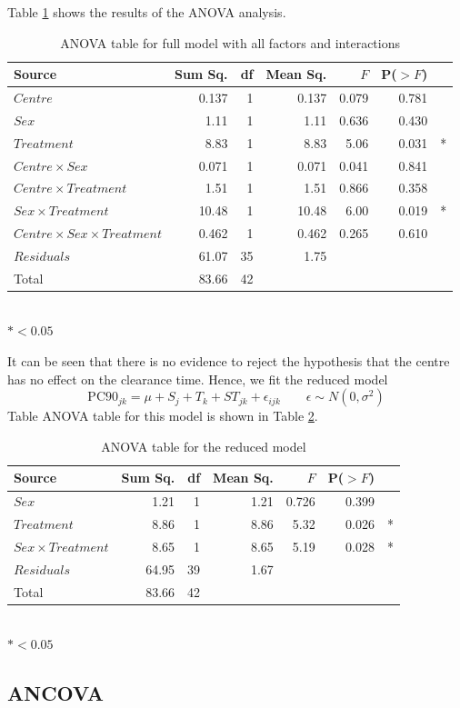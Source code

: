 Table \ref{pc90aov} shows the results of the ANOVA analysis.
\begin{table}[h]
\centering
\caption{ANOVA table for full model with all factors and interactions}\label{pc90aov}
\begin{tabular}{l|rrrrrl}
Source&Sum Sq.&df&Mean Sq.&$F$&P($>F$)\\
\hline
$Centre$     &                0.137  & 1& 0.137 & 0.079 & 0.781&\\
$Sex$        &              1.11& 1&   1.11 & 0.636 &0.430&\\
$Treatment$  &            8.83& 1&  8.83  &5.06& 0.031 &*\\
$Centre\times Sex$ &              0.071 & 1 &0.071 & 0.041 &0.841&\\
$Centre\times Treatment$ &        1.51 & 1 &1.51  &0.866 &0.358&\\
$Sex\times Treatment$     &     10.48 &1& 10.48  &6.00& 0.019 &*\\
$Centre\times Sex\times Treatment$ &   0.462  &1&0.462 & 0.265& 0.610&\\
$Residuals$      &    61.07   &35& 1.75  &&&\\
\hline
Total&83.66&42&&&
\end{tabular}\\
$*<0.05$
\end{table}
It can be seen that there is no evidence to reject the hypothesis that the centre has no effect on the clearance time. Hence, we fit the reduced model
\begin{equation}
\mathrm{PC}90_{jk}=\mu+S_j+T_k+ST_{jk}+\epsilon_{ijk}\quad\quad\epsilon\sim N(0,\sigma^2)\label{reduced}
\end{equation}
Table ANOVA table for this model is shown in Table \ref{aovreduced}.
\begin{table}[h]
\centering
\caption{ANOVA table for the reduced model}\label{aovreduced}
\begin{tabular}{l|rrrrrl}
Source&Sum Sq.&df&Mean Sq.&$F$&P($>F$)\\
\hline
$Sex$        &              1.21   &1&1.21  &0.726& 0.399&\\
$Treatment$  &            8.86   &1&8.86  &5.32 &0.026 &*\\
$Sex\times Treatment$     &     8.65  & 1&8.65 & 5.19 &0.028&*\\
$Residuals$      &    64.95  &39& 1.67  &&&\\
\hline
Total&83.66&42&&&
\end{tabular}\\
$*<0.05$
\end{table} 
\subsection{ANCOVA}